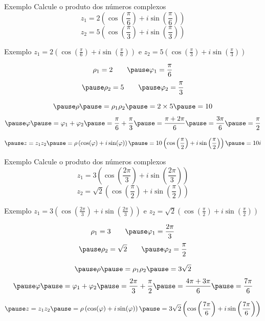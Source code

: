 \addtocounter{exemplo}{1}
\begin{frame}{Exemplo \theexemplo}
  Calcule o produto dos números complexos
  \[
    z_1 = 2\left(\cos\left(\frac{\pi}{6}\right) + i\sin\left(\frac{\pi}{6}\right)\right)
  \]
  \[
    z_2 = 5\left(\cos\left(\frac{\pi}{3}\right) + i\sin\left(\frac{\pi}{3}\right)\right)
  \]
\end{frame}

\begin{frame}{Exemplo \theexemplo}
  \(z_1 = 2\left(\cos\left(\frac{\pi}{6}\right) + i\sin\left(\frac{\pi}{6}\right)\right)\) e
  \(z_2 = 5\left(\cos\left(\frac{\pi}{3}\right) + i\sin\left(\frac{\pi}{3}\right)\right)\)

  \pause
  \[
    \rho_1 = 2
    \qquad
    \pause
    \varphi_1 = \frac{\pi}{6}
  \]
  \[
    \pause
    \rho_2 = 5
    \qquad
    \pause
    \varphi_2 = \frac{\pi}{3}
  \]

  \[
    \pause
    \rho
    \pause
    = \rho_1 \rho_2
    \pause
    = 2 \times 5
    \pause
    = 10
  \]
  \[
    \pause
    \varphi
    \pause
    = \varphi_1 + \varphi_2
    \pause
    = \frac{\pi}{6} + \frac{\pi}{3}
    \pause
    = \frac{\pi + 2\pi}{6}
    \pause
    = \frac{3\pi}{6}
    \pause
    = \frac{\pi}{2}
  \]

  \[
    \pause
    z = z_1 z_2
    \pause
    = \rho\left(\cos(\varphi)+i\sin(\varphi)\right)
    \pause
    = 10\left(\cos\left(\frac{\pi}{2}\right)+i\sin\left(\frac{\pi}{2}\right)\right)
    \pause
    = 10i
  \]
\end{frame}

\addtocounter{exemplo}{1}
\begin{frame}{Exemplo \theexemplo}
  Calcule o produto dos números complexos
  \[
    z_1 = 3\left(\cos\left(\frac{2\pi}{3}\right) + i\sin\left(\frac{2\pi}{3}\right)\right)
  \]
  \[
    z_2 = \sqrt{2}\left(\cos\left(\frac{\pi}{2}\right) + i\sin\left(\frac{\pi}{2}\right)\right)
  \]
\end{frame}


\begin{frame}{Exemplo \theexemplo}
  \(z_1 = 3\left(\cos\left(\frac{2\pi}{3}\right) + i\sin\left(\frac{2\pi}{3}\right)\right)\) e
  \(z_2 = \sqrt{2}\left(\cos\left(\frac{\pi}{2}\right) + i\sin\left(\frac{\pi}{2}\right)\right)\)

  \pause
  \[
    \rho_1 = 3
    \qquad
    \pause
    \varphi_1 = \frac{2\pi}{3}
  \]
  \[
    \pause
    \rho_2 = \sqrt{2}
    \qquad
    \pause
    \varphi_2 = \frac{\pi}{2}
  \]

  \[
    \pause
    \rho
    \pause
    = \rho_1 \rho_2
    \pause
    = 3\sqrt{2}
  \]
  \[
    \pause
    \varphi
    \pause
    = \varphi_1 + \varphi_2
    \pause
    = \frac{2\pi}{3} + \frac{\pi}{2}
    \pause
    = \frac{4\pi + 3\pi}{6}
    \pause
    = \frac{7\pi}{6}
  \]

  \[
    \pause
    z = z_1 z_2
    \pause
    = \rho\left(\cos(\varphi)+i\sin(\varphi)\right)
    \pause
    = 3\sqrt{2}\left(\cos\left(\frac{7\pi}{6}\right)+i\sin\left(\frac{7\pi}{6}\right)\right)
  \]
\end{frame}

